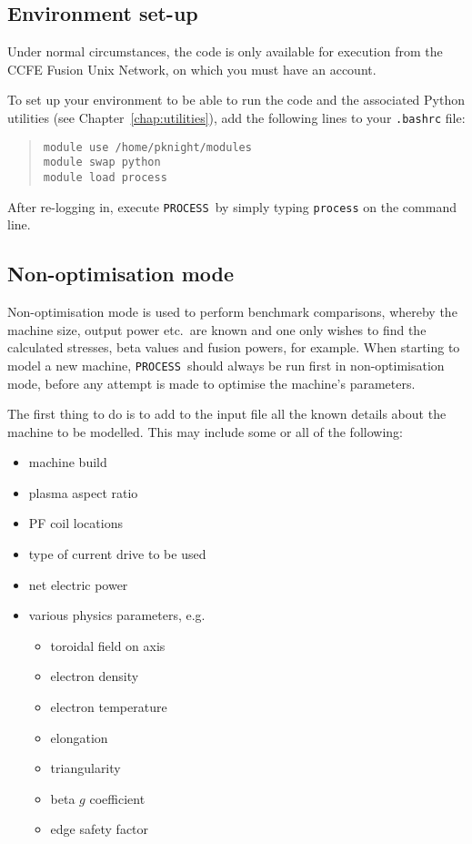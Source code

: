 \documentclass[11pt,a4paper]{report}
\newcommand{\process}{\mbox{\texttt{PROCESS}}}
\begin{document}
\subsection{Environment set-up}
\label{sec:run_environment}

Under normal circumstances, the code is only available for execution from the
CCFE Fusion Unix Network, on which you must have an account.

To set up your environment to be able to run the code and the associated
Python utilities (see Chapter~\ref{chap:utilities}), add the following lines
to your \texttt{.bashrc} file:
\begin{quote}
\begin{verbatim}
module use /home/pknight/modules
module swap python
module load process
\end{verbatim}
\end{quote}
After re-logging in, execute \process\ by simply typing \texttt{process} on
the command line.

\subsection{Non-optimisation mode}

Non-optimisation mode is used to perform benchmark comparisons, whereby the
machine size, output power etc.\ are known and one only wishes to find the
calculated stresses, beta values and fusion powers, for example. When starting
to model a new machine, \process\ should always be run first in non-optimisation
mode, before any attempt is made to optimise the machine's parameters.

The first thing to do is to add to the input file all the known details about
the machine to be modelled. This may include some or all of the following:
\begin{itemize}
\item machine build
\item plasma aspect ratio
\item PF coil locations
\item type of current drive to be used
\item net electric power
\item various physics parameters, e.g.
\begin{itemize}
\item toroidal field on axis
\item electron density
\item electron temperature
\item elongation
\item triangularity
\item beta $g$ coefficient
\item edge safety factor
\end{itemize}
\end{itemize}
\end{document}
